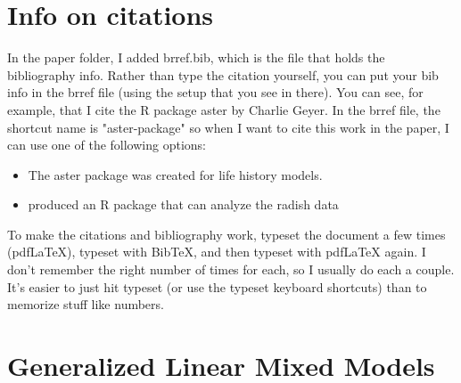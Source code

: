 \documentclass{article}
\begin{document}
\section{Info on citations}
In the paper folder, I added brref.bib, which is the file that holds the bibliography info. Rather than  type the citation yourself, you can put your bib info in the brref file (using the setup that you see in there). You can see, for example, that I cite the R package aster by Charlie Geyer. In the brref file, the shortcut name is "aster-package" so when I want to cite this work in the paper, I can use one of the following options:
\begin{itemize}
\item The aster package \citep{aster-package} was created for life history models.
\item  \citet{aster-package} produced an R package that can analyze the radish data 
\end{itemize}

To make the citations and bibliography work, typeset the document a few times (pdfLaTeX), typeset with BibTeX, and then typeset with pdfLaTeX again. I don't remember the right number of times for each, so I usually do each a couple. It's easier to just hit typeset (or use the typeset keyboard shortcuts) than to memorize stuff like numbers. 

\section{Generalized Linear Mixed Models}
\end{document}
